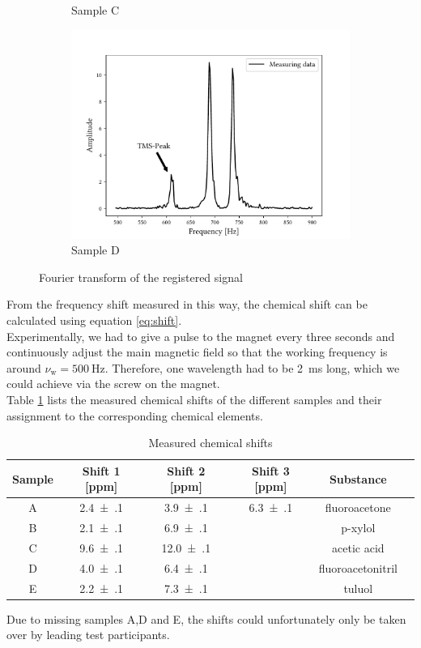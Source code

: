 \begin{figure}[ht]
\begin{subfigure}{.45\textwidth}
\caption{Sample C}
\end{subfigure}
\qquad
\begin{subfigure}{.45\textwidth}
\includegraphics[width=9.3cm]{..//figures//f61_abb_7.pdf}
\caption{Sample D}
\end{subfigure}
\caption{Fourier transform of the registered signal}
\label{fig:fourier}
\end{figure}
From the frequency shift measured in this way, the chemical shift can be calculated using equation \ref{eq:shift}.\\
Experimentally, we had to give a pulse to the magnet every three seconds and continuously adjust the main magnetic field so that the working frequency is around $\nu_\text{w}=\SI{500}{\hertz}$.
Therefore, one wavelength had to be \SI{2}{\milli\second} long, which we could achieve via the screw on the magnet.\\
Table \ref{tab:shift} lists the measured chemical shifts of the different samples and their assignment to the corresponding chemical elements.
\begin{table}[ht]
\centering
\begin{tabular}{cccccc}
\toprule
Sample & Shift 1 [ppm] & Shift 2 [ppm] & Shift 3 [ppm] & Substance\\
\midrule
A & \num{2.4(1)} & \num{3.9(1)} & \num{6.3(1)} & fluoroacetone\\
B & \num{2.1(1)} & \num{6.9(1)} & & p-xylol\\
C & \num{9.6(1)} & \num{12.0(1)} & & acetic acid\\
D & \num{4.0(1)} & \num{6.4(1)} & & fluoroacetonitril\\
E & \num{2.2(1)} & \num{7.3(1)} & & tuluol\\
\bottomrule
\end{tabular}
\caption{Measured chemical shifts}
\label{tab:shift}
\end{table}
Due to missing samples A,D and E, the shifts could unfortunately only be taken over by leading test participants.\\

